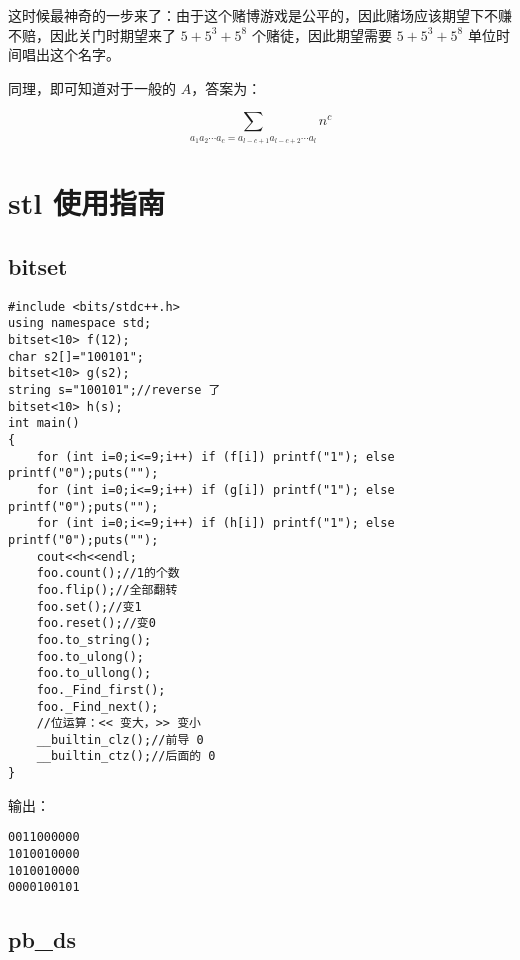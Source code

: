 \documentclass[12pt]{ctexart}
\begin{document}
这时候最神奇的一步来了：由于这个赌博游戏是公平的，因此赌场应该期望下不赚不赔，因此关门时期望来了 $5+5^3+5^8$ 个赌徒，因此期望需要 $5+5^3+5^8$ 单位时间唱出这个名字。

同理，即可知道对于一般的 $A$，答案为：

$$\sum\limits_{a_1a_2\cdots a_c=a_{l-c+1}a_{l-c+2}\cdots a_l} n^c$$


 \newpage

 \section{stl 使用指南}

\subsection{bitset}

\begin{lstlisting}
#include <bits/stdc++.h>
using namespace std;
bitset<10> f(12);
char s2[]="100101";
bitset<10> g(s2);
string s="100101";//reverse 了
bitset<10> h(s);
int main()
{
	for (int i=0;i<=9;i++) if (f[i]) printf("1"); else printf("0");puts("");
	for (int i=0;i<=9;i++) if (g[i]) printf("1"); else printf("0");puts("");
	for (int i=0;i<=9;i++) if (h[i]) printf("1"); else printf("0");puts("");
	cout<<h<<endl;
    foo.count();//1的个数
	foo.flip();//全部翻转
	foo.set();//变1
	foo.reset();//变0
	foo.to_string();
	foo.to_ulong();
	foo.to_ullong();
	foo._Find_first();
	foo._Find_next();
    //位运算：<< 变大，>> 变小
    __builtin_clz();//前导 0
    __builtin_ctz();//后面的 0
}
\end{lstlisting}

输出：

\begin{verbatim}
0011000000
1010010000
1010010000
0000100101
\end{verbatim}

\subsection{pb\_ds}
\end{document}
